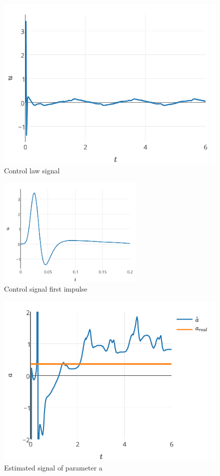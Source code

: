 \documentclass[journal]{IEEEtran}
\begin{document}
\begin{figure}[!t]
    \centering
    \includegraphics[width=\textwidth]{control}
    \caption{Control law signal}
    \label{fig_control}
\end{figure}

\begin{figure}[!t]
    \centering
    \includegraphics[width=7cm]{controlimpulse}
    \caption{Control signal first impulse}
    \label{fig_controlimpulse}
\end{figure}

\begin{figure}[!t]
    \centering
    \includegraphics[width=\textwidth]{parametroa}
    \caption{Estimated signal of parameter a}
    \label{fig_parametroa}
\end{figure}
\end{document}
